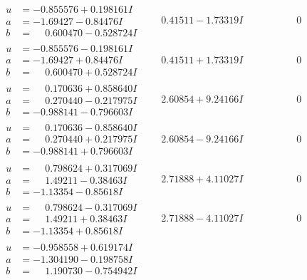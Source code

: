 \documentclass[1p]{elsarticle_modified}
\theoremstyle{definition}
\begin{document}
$$\begin{array}{c|c|c}
\begin{aligned}
u &= -0.855576 + 0.198161 I \\
a &= -1.69427 - 0.84476 I \\
b &= \phantom{-}0.600470 - 0.528724 I\end{aligned}
 & \phantom{-}0.41511 - 1.73319 I & \phantom{-0.000000 } 0 \\ \hline\begin{aligned}
u &= -0.855576 - 0.198161 I \\
a &= -1.69427 + 0.84476 I \\
b &= \phantom{-}0.600470 + 0.528724 I\end{aligned}
 & \phantom{-}0.41511 + 1.73319 I & \phantom{-0.000000 } 0 \\ \hline\begin{aligned}
u &= \phantom{-}0.170636 + 0.858640 I \\
a &= \phantom{-}0.270440 - 0.217975 I \\
b &= -0.988141 - 0.796603 I\end{aligned}
 & \phantom{-}2.60854 + 9.24166 I & \phantom{-0.000000 } 0 \\ \hline\begin{aligned}
u &= \phantom{-}0.170636 - 0.858640 I \\
a &= \phantom{-}0.270440 + 0.217975 I \\
b &= -0.988141 + 0.796603 I\end{aligned}
 & \phantom{-}2.60854 - 9.24166 I & \phantom{-0.000000 } 0 \\ \hline\begin{aligned}
u &= \phantom{-}0.798624 + 0.317069 I \\
a &= \phantom{-}1.49211 - 0.38463 I \\
b &= -1.13354 - 0.85618 I\end{aligned}
 & \phantom{-}2.71888 + 4.11027 I & \phantom{-0.000000 } 0 \\ \hline\begin{aligned}
u &= \phantom{-}0.798624 - 0.317069 I \\
a &= \phantom{-}1.49211 + 0.38463 I \\
b &= -1.13354 + 0.85618 I\end{aligned}
 & \phantom{-}2.71888 - 4.11027 I & \phantom{-0.000000 } 0 \\ \hline\begin{aligned}
u &= -0.958558 + 0.619174 I \\
a &= -1.304190 - 0.198758 I \\
b &= \phantom{-}1.190730 - 0.754942 I\end{aligned}

\end{array}$$
\end{document}
